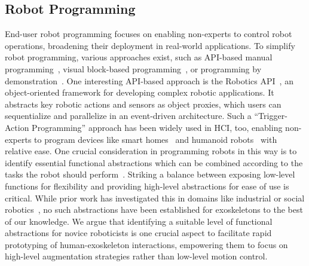 \subsection{Robot Programming}
End-user robot programming focuses on enabling non-experts to control robot operations, broadening their deployment in real-world applications. To simplify robot programming, various approaches exist, such as API-based manual programming~\cite{diprose_2017, angerer_2013}, visual block-based programming~\cite{weintrop_2018}, or programming by demonstration~\cite{ajaykumar_2021}.
One interesting API-based approach is the Robotics API~\cite{angerer_2013}, an object-oriented framework for developing complex robotic applications. It abstracts key robotic actions and sensors as object proxies, which users can sequentialize and parallelize in an event-driven architecture. Such a ``Trigger-Action Programming'' approach has been widely used in HCI, too, enabling non-experts to program devices like smart homes~\cite{ur_2014} and humanoid robots~\cite{leonardi_2019} with relative ease. 
One crucial consideration in programming robots in this way is to identify essential functional abstractions which can be combined according to the tasks the robot should perform~\cite{desantis_2008}. 
Striking a balance between exposing low-level functions for flexibility and providing high-level abstractions for ease of use is critical. While prior work has investigated this in domains like industrial or social robotics~\cite{angerer_2013,leonardi_2019}, no such abstractions have been established for exoskeletons to the best of our knowledge. We argue that identifying a suitable level of functional abstractions for novice roboticists is one crucial aspect to facilitate rapid prototyping of human-exoskeleton interactions, empowering them to focus on high-level augmentation strategies rather than low-level motion control.


